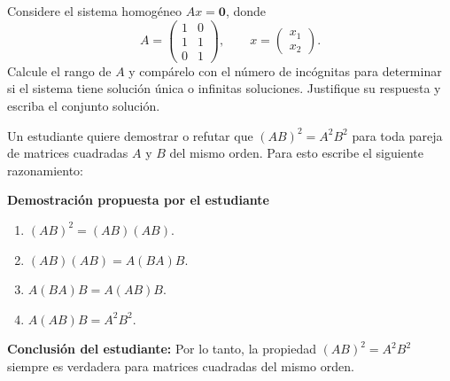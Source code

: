 \documentclass[10pt,a4]{examenEPN0}
\begin{document}
\encabezado
{}

\indicacionesPrueba

\begin{preguntas}


\item Considere el sistema homogéneo $Ax=\mathbf{0}$, donde
\[
    A = \begin{pmatrix} 1 & 0 \\ 1 & 1 \\ 0 & 1 \end{pmatrix},
    \qquad x = \begin{pmatrix} x_1 \\ x_2 \end{pmatrix}.
\]
Calcule el rango de $A$ y compárelo con el número de incógnitas para determinar si el sistema tiene solución única o infinitas soluciones. Justifique su respuesta y escriba el conjunto solución.
    


\par\vfill\newpage


\item Un estudiante quiere demostrar o refutar que $(AB)^2 = A^2 B^2$ para toda pareja de matrices cuadradas $A$ y $B$ del mismo orden. Para esto escribe el siguiente razonamiento:
\par\medskip
\noindent\colorbox{gray!15}{%
    \begin{minipage}{\dimexpr\linewidth-2\fboxsep\relax}
        \normalfont\normalsize\raggedright
        \textbf{Demostración propuesta por el estudiante}
        \begin{enumerate}[label=\arabic*.,leftmargin=*,topsep=4pt,itemsep=2pt,parsep=0pt]
            \item $(AB)^2 = (AB)(AB)$.
            \item $(AB)(AB)=A(BA)B$.
            \item $A(BA)B= A(AB)B$.
            \item $A(AB)B = A^2 B^2$.
        \end{enumerate}
        \textbf{Conclusión del estudiante:} Por lo tanto, la propiedad
        $(AB)^2 = A^2 B^2$ siempre es verdadera para matrices cuadradas
        del mismo orden.
    \end{minipage}%
}
\par\medskip



\end{preguntas}
\end{document}

